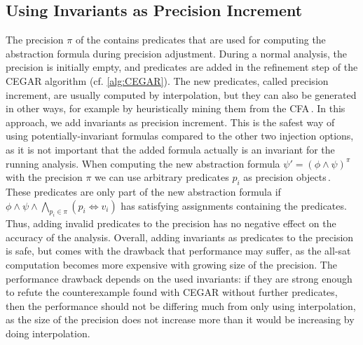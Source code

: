 \subsection{Using Invariants as Precision Increment}\label{title:inv_prec}
The precision $\pi$ of the \PredicateCPA{} contains predicates that are used for computing the abstraction formula during precision adjustment. During a normal analysis, the precision is 
initially empty, and predicates are added in the refinement step of the \ac{CEGAR} algorithm (cf. \autoref{alg:CEGAR}). The new predicates, called precision increment, are usually computed by 
interpolation, but they can also be generated in other ways, for example by heuristically mining them from the \ac{CFA}\,. In this approach, we add 
invariants as precision increment. This is the safest way of using potentially-invariant formulas compared to the other two injection options, as it is not important that the 
added formula actually is an invariant for the running analysis. When computing the new abstraction formula $\psi' = (\phi \land \psi)^\pi$ with the precision $\pi$ we can use arbitrary predicates  
$p_i$ as precision 
objects\,. These predicates are only part of the new abstraction formula if $\phi \land \psi 
\land \bigwedge_{p_i \in \pi}(p_i \iff v_i)$ has satisfying assignments containing the predicates. Thus, adding invalid predicates to the precision has no negative effect on the accuracy of the analysis. 
Overall, adding invariants as predicates to the precision is safe, but comes with the drawback that performance may suffer, as the all-sat computation becomes more expensive with growing 
size of the precision. The performance drawback depends on the used invariants: if they are strong enough to refute the counterexample found with \ac{CEGAR} without further predicates, then 
the performance should not be differing much from only using interpolation, as the size of the precision does not increase more than it would be increasing by doing interpolation.

